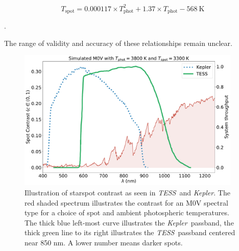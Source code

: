 \documentclass[twocolumn]{aastex631}
\newcommand{\tess}{{\it TESS}}
\newcommand{\kepler}{{\it Kepler}}
\begin{document}
\begin{equation}
  T_{\mathrm{spot}} = 0.000117 \times T_{\mathrm{phot}}^2 + 1.37 \times T_{\mathrm{phot}} - 568 ~\mathrm{K}
  \label{eq:TspotFang}
\end{equation}

.

The range of validity and accuracy of these relationships remain unclear.




\begin{figure}[hbt!]
  \includegraphics[width=0.95\textwidth]{figures/contrast_spectrum2.pdf}
  \caption{Illustration of starspot contrast as seen in \tess\ and \kepler. The red shaded spectrum illustrates the contrast for an M0V spectral type for a choice of spot and ambient photospheric temperatures. The thick blue left-most curve illustrates the \kepler\ passband, the thick green line to its right illustrates the \tess\ passband centered near 850 nm.  A lower number means darker spots.  }
  \label{fig:filtercurve}
\end{figure}
\end{document}
